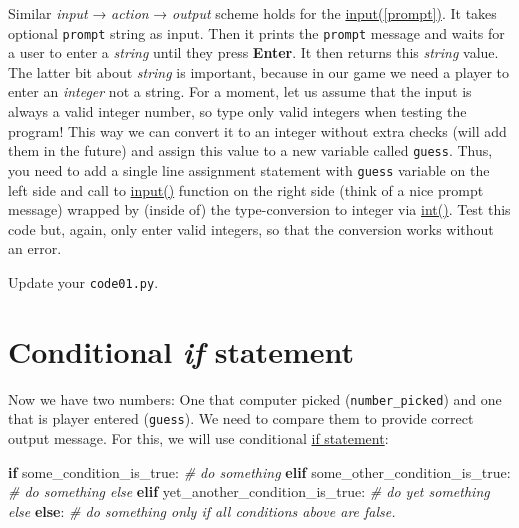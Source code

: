 \documentclass[
]{book}
\newenvironment{Shaded}{\begin{snugshade}}{\end{snugshade}}
\newcommand{\CommentTok}[1]{\textcolor[rgb]{0.56,0.35,0.01}{\textit{#1}}}
\newcommand{\ControlFlowTok}[1]{\textcolor[rgb]{0.13,0.29,0.53}{\textbf{#1}}}
\newcommand{\NormalTok}[1]{#1}
\begin{document}
Similar \emph{input} → \emph{action} → \emph{output} scheme holds for the \href{https://docs.python.org/3/library/functions.html\#input}{input({[}prompt{]})}. It takes optional \texttt{prompt} string as input. Then it prints the \texttt{prompt} message and waits for a user to enter a \emph{string} until they press \textbf{Enter}. It then returns this \emph{string} value. The latter bit about \emph{string} is important, because in our game we need a player to enter an \emph{integer} not a string. For a moment, let us assume that the input is always a valid integer number, so type only valid integers when testing the program! This way we can convert it to an integer without extra checks (will add them in the future) and assign this value to a new variable called \texttt{guess}. Thus, you need to add a single line assignment statement with \texttt{guess} variable on the left side and call to \href{https://docs.python.org/3/library/functions.html\#input}{input()} function on the right side (think of a nice prompt message) wrapped by (inside of) the type-conversion to integer via \href{https://docs.python.org/3/library/functions.html\#int}{int()}. Test this code but, again, only enter valid integers, so that the conversion works without an error.

Update your \texttt{code01.py}.

\hypertarget{if-statement}{%
\section{\texorpdfstring{Conditional \emph{if} statement}{Conditional if statement}}\label{if-statement}}

Now we have two numbers: One that computer picked (\texttt{number\_picked}) and one that is player entered (\texttt{guess}). We need to compare them to provide correct output message. For this, we will use conditional \href{https://docs.python.org/3/tutorial/controlflow.html\#if-statements}{if statement}:

\begin{Shaded}
\begin{Highlighting}[]
\ControlFlowTok{if}\NormalTok{ some\_condition\_is\_true:}
    \CommentTok{\# do something}
\ControlFlowTok{elif}\NormalTok{ some\_other\_condition\_is\_true:}
    \CommentTok{\# do something else}
\ControlFlowTok{elif}\NormalTok{ yet\_another\_condition\_is\_true:}
    \CommentTok{\# do yet something else}
\ControlFlowTok{else}\NormalTok{:}
    \CommentTok{\# do something only if all conditions above are false.}
\end{Highlighting}
\end{Shaded}
\end{document}
